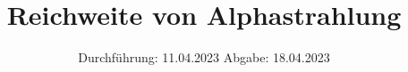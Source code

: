 

\subject{VERSUCH NUMMER 701}
\title{Reichweite von Alphastrahlung}
\date{
  Durchführung: 11.04.2023
  \hspace{3em}
  Abgabe: 18.04.2023
}



\maketitle
\thispagestyle{empty}
\tableofcontents
\newpage
\setcounter{page}{1}








\newpage
\printbibliography
\nocite{ap308}
\nocite{matplotlib}
\nocite{numpy}
\nocite{scipy}
\nocite{uncertainties}
\nocite{reback2020pandas}

\newpage

\newpage



